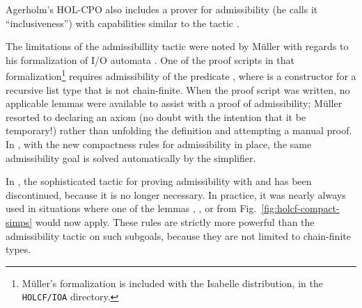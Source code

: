 Agerholm's HOL-CPO also includes a prover for admissibility (he calls it ``inclusiveness'') with capabilities similar to the  tactic \cite[\S5.3]{agerholm94thesis}.
 
The limitations of the  admissibillity tactic were noted by M\"uller with regards to his formalization of I/O automata \cite[\S10.3.2]{mueller98thesis}. One of the proof scripts in that formalization\footnote{M\"uller's formalization is included with the Isabelle distribution, in the \texttt{HOLCF/IOA} directory.} requires admissibility of the predicate  , where  is a constructor for a recursive list type that is not chain-finite. When the proof script was written, no applicable lemmas were available to assist with a proof of admissibility; M\"uller resorted to declaring an axiom (no doubt with the intention that it be temporary!) rather than unfolding the definition and attempting a manual proof. In , with the new compactness rules for admissibility in place, the same admissibility goal is solved automatically by the simplifier.

In , the sophisticated  tactic for proving admissibility with  and  has been discontinued, because it is no longer necessary. In practice, it was nearly always used in situations where one of the lemmas , , or  from Fig.~\ref{fig:holcf-compact-simps} would now apply. These rules are strictly more powerful than the  admissibility tactic on such subgoals, because they are not limited to chain-finite types.

